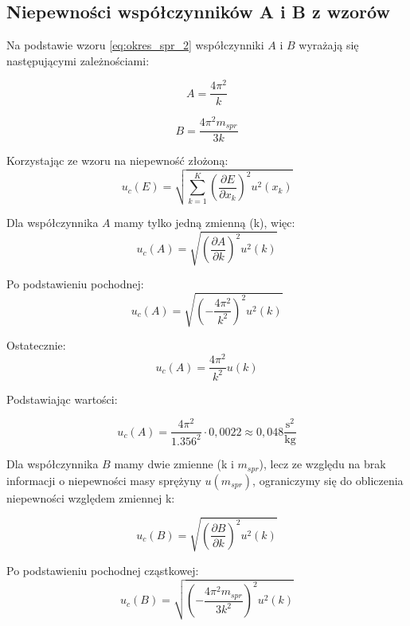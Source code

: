 \documentclass[a4paper,12pt]{article}
\begin{document}
\subsection{Niepewności współczynników A i B z wzorów}
Na podstawie wzoru \ref{eq:okres_spr_2} współczynniki $A$ i $B$ wyrażają się następującymi zależnościami:

\begin{equation*}
    A = \frac{4\pi^2}{k}
\end{equation*}

\begin{equation*}
    B = \frac{4\pi^2m_{spr}}{3k}
\end{equation*}



Korzystając ze wzoru na niepewność złożoną:
\begin{equation*}
    u_c(E) = \sqrt{\sum_{k=1}^{K} \left( \frac{\partial E}{\partial x_k} \right)^2 u^2(x_k)}
\end{equation*}

Dla współczynnika $A$ mamy tylko jedną zmienną (k), więc:
\begin{equation*}
    u_c(A) = \sqrt{\left(\frac{\partial A}{\partial k}\right)^2 u^2(k)}
\end{equation*}

Po podstawieniu pochodnej:
\begin{equation*}
    u_c(A) = \sqrt{\left(-\frac{4\pi^2}{k^2}\right)^2 u^2(k)}
\end{equation*}

Ostatecznie:
\begin{equation*}
    u_c(A) = \frac{4\pi^2}{k^2} u(k)
\end{equation*}

Podstawiając wartości:

\begin{equation*}
    u_c(A) = \frac{4\pi^2}{1.356^2} \cdot 0,0022 \approx 0,048 \frac{\text{s}^2}{\text{kg}}
\end{equation*}

Dla współczynnika $B$ mamy dwie zmienne (k i $m_{spr}$), lecz ze względu na brak informacji o niepewności masy sprężyny $u(m_{spr})$, ograniczymy się do obliczenia niepewności względem zmiennej k:

\begin{equation*}
    u_c(B) = \sqrt{\left(\frac{\partial B}{\partial k}\right)^2 u^2(k)}
\end{equation*}

Po podstawieniu pochodnej cząstkowej:
\begin{equation*}
    u_c(B) = \sqrt{\left(-\frac{4\pi^2m_{spr}}{3k^2}\right)^2 u^2(k)}
\end{equation*}
\end{document}
